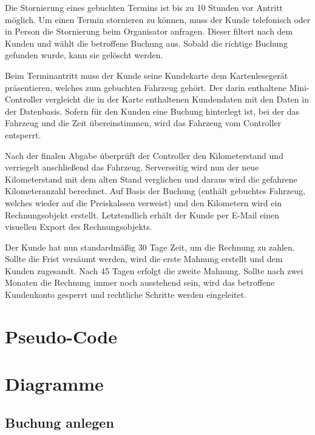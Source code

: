 Die Stornierung eines gebuchten Termins ist bis zu 10 Stunden vor Antritt möglich. Um einen Termin stornieren zu können, muss der Kunde telefonisch oder in Person die Stornierung beim Organisator anfragen. Dieser filtert nach dem Kunden und wählt die betroffene Buchung aus. Sobald die richtige Buchung gefunden wurde, kann sie gelöscht werden.


Beim Terminantritt muss der Kunde seine Kundekarte dem Kartenlesegerät präsentieren, welches zum gebuchten Fahrzeug gehört. Der darin enthaltene Mini-Controller vergleicht die in der Karte enthaltenen Kundendaten mit den Daten in der Datenbasis. Sofern für den Kunden eine Buchung hinterlegt ist, bei der das Fahrzeug und die Zeit übereinstimmen, wird das Fahrzeug vom Controller entsperrt.


Nach der finalen Abgabe überprüft der Controller den Kilometerstand und verriegelt anschließend das Fahrzeug. Serverseitig wird nun der neue Kilometerstand mit dem alten Stand verglichen und daraus wird die gefahrene Kilometeranzahl berechnet. Auf Basis der Buchung (enthält gebuchtes Fahrzeug, welches wieder auf die Preiskalssen verweist) und den Kilometern wird ein Rechnungsobjekt erstellt. Letztendlich erhält der Kunde per E-Mail einen visuellen Export des Rechnungsobjekts.


Der Kunde hat nun standardmäßig 30 Tage Zeit, um die Rechnung zu zahlen. Sollte die Frist versäumt werden, wird die erste Mahnung erstellt und dem Kunden zugesandt. Nach 45 Tagen erfolgt die zweite Mahnung. Sollte nach zwei Monaten die Rechnung immer noch ausstehend sein, wird das betroffene Kundenkonto gesperrt und rechtliche Schritte werden eingeleitet.

\newpage

\section{Pseudo-Code}



\section{Diagramme}

\subsection{Buchung anlegen}


